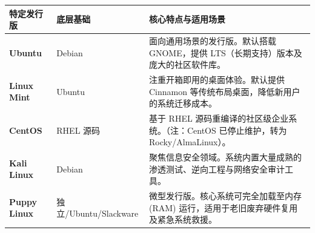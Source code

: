 \documentclass[border=15pt]{standalone} %
\begin{document}
\sffamily
\renewcommand{\arraystretch}{1.5}

\begin{tabularx}{16cm}{>{\bfseries}p{2.5cm} p{4cm} X}
	\rowcolor{headerbg}
	\toprule
	\textcolor{headertext}{\textbf{特定发行版}} & \textcolor{headertext}{\textbf{底层基础}} & \textcolor{headertext}{\textbf{核心特点与适用场景}}                         \\
	\midrule

	Ubuntu                                 & Debian                                & 面向通用场景的发行版。默认搭载 GNOME，提供 LTS（长期支持）版本及庞大的社区软件库。                     \\
	\addlinespace[1ex]
	Linux Mint                             & Ubuntu                                & 注重开箱即用的桌面体验。默认提供 Cinnamon 等传统布局桌面，降低新用户的系统迁移成本。                    \\
	\addlinespace[1ex]
	CentOS                                 & RHEL 源码                               & 基于 RHEL 源码重编译的社区级企业系统。\newline（注：CentOS 已停止维护，转为 Rocky/AlmaLinux）。 \\
	\addlinespace[1ex]
	Kali Linux                             & Debian                                & 聚焦信息安全领域。系统内置大量成熟的渗透测试、逆向工程与网络安全审计工具。                              \\
	\addlinespace[1ex]
	Puppy Linux                            & 独立/Ubuntu/Slackware                   & 微型发行版。核心系统可完全加载至内存 (RAM) 运行，适用于老旧废弃硬件复用及紧急系统救援。                    \\
	\bottomrule
\end{tabularx}
\end{document}
